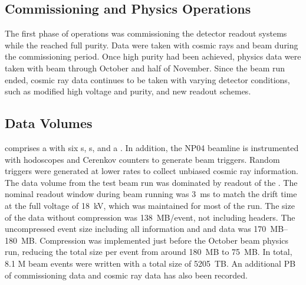 \subsection{Commissioning and Physics Operations}

The first phase of operations was commissioning the detector readout systems while the  reached full purity.  Data were taken with cosmic rays and beam during the commissioning period. Once high  purity had been achieved, physics data were  taken with beam through October and half of November. %
Since the beam run ended, cosmic ray data continues to be taken with varying detector conditions, such as modified high voltage and purity, and new readout schemes. 



\subsection{Data Volumes}
 comprises a  with  six s, s, and a . In addition, the NP04 beamline is instrumented with hodoscopes and Cerenkov counters to generate beam triggers. Random triggers  were generated at lower rates to collect unbiased cosmic ray information. The data volume from the test beam run was dominated by readout of the . %
The nominal readout window during beam running was  \SI{3}{ms} to match the drift time at the full voltage of \SI{18}{kV}, which was maintained for most of the run.  The size of the  data without compression was  \SI{138}{MB/event}, not including headers.  The uncompressed event size including all  information and  and  data was \SIrange{170}{180}{MB}. Compression was implemented just before the October beam physics run, reducing the total size per event from around \SI{180}{MB} to \SI{75}{MB}.  In total, 8.1 M beam events were written with a total size of \SI{5205}{TB}.  An additional PB of commissioning data and cosmic ray data has also been recorded. 



